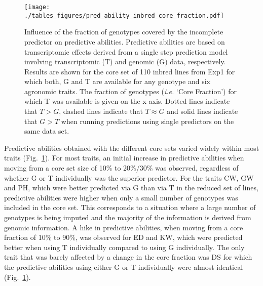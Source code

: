 \documentclass[12pt,titlepage]{article}
\begin{document}
\begin{figure}[H]
  \centering
  \texttt{[image: ./tables\_figures/pred\_ability\_inbred\_core\_fraction.pdf]}
  \caption{
  Influence of the fraction of genotypes covered by the incomplete predictor
  on predictive abilities.
  Predictive abilities are based on transcriptomic effects derived from a
  single step prediction model involving transcriptomic (T) and genomic (G)
  data, respectively.
  Results are shown for the core set of 110 inbred lines from Exp1 for
  which both, G and T are available for any genotype and six agronomic traits.
  The fraction of genotypes (\textit{i.e.} `Core Fraction') for which
  T was available is given on the x-axis.
  Dotted lines indicate that $T > G$, dashed lines indicate that $T \approx G$
  and solid lines indicate that $G > T$ when running predictions using single
  predictors on the same data set.
  }
\label{fig:InbredResults}
\end{figure}


Predictive abilities obtained with the different core sets varied widely within
most traits (Fig.~\ref{fig:InbredResults}).
For most traits, an initial increase in predictive abilities when moving
from a core set size of 10\% to 20\%/30\% was observed, regardless of whether G
or T individually was the superior predictor.
For the traits CW, GW and PH, which were better predicted via G than via T in
the reduced set of lines, predictive abilities were higher when only a small
number of genotypes was included in the core set.
This corresponds to a situation where a large number of genotypes is being 
imputed and the majority of the information is derived from genomic information.
A hike in predictive abilities, when moving from a core fraction of 10\% to 
90\%, was observed for ED and KW, which were predicted better when using T
individually compared to using G individually.
The only trait that was barely affected by a change in the core fraction was DS
for which the predictive abilities using either G or T individually were almost
identical (Fig.~\ref{fig:InbredResults}).
\end{document}
